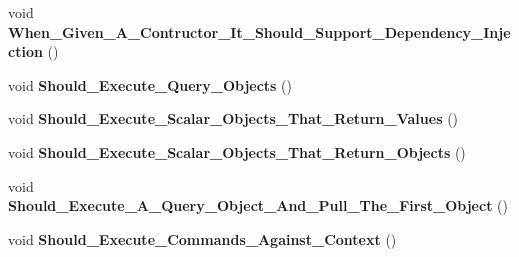 \begin{DoxyCompactItemize}
\item 
\hypertarget{class_highway_1_1_data_1_1_entity_framework_1_1_tests_1_1_unit_tests_1_1_given___a___generic___repository_a0a7399365a4a4b355d66b465644f4c7a}{void {\bfseries When\-\_\-\-Given\-\_\-\-A\-\_\-\-Contructor\-\_\-\-It\-\_\-\-Should\-\_\-\-Support\-\_\-\-Dependency\-\_\-\-Injection} ()}\label{class_highway_1_1_data_1_1_entity_framework_1_1_tests_1_1_unit_tests_1_1_given___a___generic___repository_a0a7399365a4a4b355d66b465644f4c7a}

\item 
\hypertarget{class_highway_1_1_data_1_1_entity_framework_1_1_tests_1_1_unit_tests_1_1_given___a___generic___repository_aca145377e750f1981c6af4054fefb63e}{void {\bfseries Should\-\_\-\-Execute\-\_\-\-Query\-\_\-\-Objects} ()}\label{class_highway_1_1_data_1_1_entity_framework_1_1_tests_1_1_unit_tests_1_1_given___a___generic___repository_aca145377e750f1981c6af4054fefb63e}

\item 
\hypertarget{class_highway_1_1_data_1_1_entity_framework_1_1_tests_1_1_unit_tests_1_1_given___a___generic___repository_a6db453321311ae338d2d1548de69e4a9}{void {\bfseries Should\-\_\-\-Execute\-\_\-\-Scalar\-\_\-\-Objects\-\_\-\-That\-\_\-\-Return\-\_\-\-Values} ()}\label{class_highway_1_1_data_1_1_entity_framework_1_1_tests_1_1_unit_tests_1_1_given___a___generic___repository_a6db453321311ae338d2d1548de69e4a9}

\item 
\hypertarget{class_highway_1_1_data_1_1_entity_framework_1_1_tests_1_1_unit_tests_1_1_given___a___generic___repository_a5e3798199831703cc726994e87ba74c2}{void {\bfseries Should\-\_\-\-Execute\-\_\-\-Scalar\-\_\-\-Objects\-\_\-\-That\-\_\-\-Return\-\_\-\-Objects} ()}\label{class_highway_1_1_data_1_1_entity_framework_1_1_tests_1_1_unit_tests_1_1_given___a___generic___repository_a5e3798199831703cc726994e87ba74c2}

\item 
\hypertarget{class_highway_1_1_data_1_1_entity_framework_1_1_tests_1_1_unit_tests_1_1_given___a___generic___repository_a1b57c7aa8dd8e6f6d9ed8d152c1f81c5}{void {\bfseries Should\-\_\-\-Execute\-\_\-\-A\-\_\-\-Query\-\_\-\-Object\-\_\-\-And\-\_\-\-Pull\-\_\-\-The\-\_\-\-First\-\_\-\-Object} ()}\label{class_highway_1_1_data_1_1_entity_framework_1_1_tests_1_1_unit_tests_1_1_given___a___generic___repository_a1b57c7aa8dd8e6f6d9ed8d152c1f81c5}

\item 
\hypertarget{class_highway_1_1_data_1_1_entity_framework_1_1_tests_1_1_unit_tests_1_1_given___a___generic___repository_ae0c6718bc454e72cf1a4241c100e27be}{void {\bfseries Should\-\_\-\-Execute\-\_\-\-Commands\-\_\-\-Against\-\_\-\-Context} ()}\label{class_highway_1_1_data_1_1_entity_framework_1_1_tests_1_1_unit_tests_1_1_given___a___generic___repository_ae0c6718bc454e72cf1a4241c100e27be}

\end{DoxyCompactItemize}

